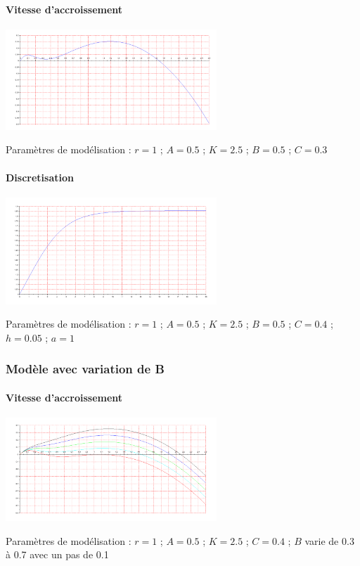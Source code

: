 \documentclass{article}
\begin{document}
\paragraph{Vitesse d'accroissement}
\begin{center}
\includegraphics[width=300px]{img/part2/Log.png}
\end{center}
Paramètres de modélisation : $r=1$ ; $A=0.5$ ; $K=2.5$ ; $B=0.5$ ; $C=0.3$
\paragraph{}


\paragraph{Discretisation}
\begin{center}
\includegraphics[width=300px]{img/part2/Traj.png}
\end{center}
Paramètres de modélisation : $r=1$ ; $A=0.5$ ; $K=2.5$ ; $B=0.5$ ; $C=0.4$ ; $h=0.05$ ; $a=1$
\paragraph{}

\subsubsection{Modèle avec variation de B}

\paragraph{Vitesse d'accroissement}
\begin{center}
\includegraphics[width=300px]{img/part2/LogB.png}
\end{center}
Paramètres de modélisation : $r=1$ ; $A=0.5$ ; $K=2.5$ ; $C=0.4$ ; $B$ varie de 0.3 à 0.7 avec un pas de 0.1
\end{document}
